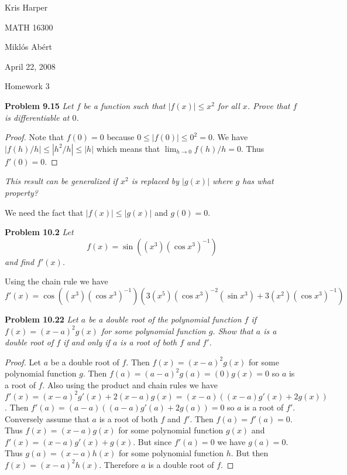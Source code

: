 \documentclass{article}
\begin{document}
\begin{flushright}
Kris Harper

MATH 16300

Mikl\'{o}s Ab\'{e}rt

April 22, 2008
\end{flushright}

\begin{center}
Homework 3
\end{center}

\begin{flushleft}

\textbf{Problem 9.15}
\textsl{Let $f$ be a function such that $|f(x)| \leq x^2$ for all $x$. Prove that $f$ is differentiable at $0$.}
\begin{proof}
Note that $f(0) = 0$ because $0 \leq |f(0)| \leq 0^2 = 0$. We have $|f(h)/h| \leq |h^2/h| \leq |h|$ which means that $\lim_{h \rightarrow 0} f(h)/h = 0$. Thus $f'(0) = 0$.
\end{proof}

\textsl{This result can be generalized if $x^2$ is replaced by $|g(x)|$ where $g$ has what property?}\newline

We need the fact that $|f(x)| \leq |g(x)|$ and $g(0) = 0$.\newline

\textbf{Problem 10.2}
\textsl{Let
\[
f(x) = \sin \left ( (x^3)(\cos x^3)^{-1} \right )
\]
and find $f'(x)$.}\newline

Using the chain rule we have
\[
f'(x) = \cos \left ( (x^3)(\cos x^3)^{-1} \right ) \left ( 3(x^5)(\cos x^3)^{-2}(\sin x^3) + 3(x^2)(\cos x^3)^{-1} \right )
\]\newline

\textbf{Problem 10.22}
\textsl{Let $a$ be a double root of the polynomial function $f$ if $f(x) = (x-a)^2g(x)$ for some polynomial function $g$. Show that $a$ is a double root of $f$ if and only if $a$ is a root of both $f$ and $f'$.}
\begin{proof}
Let $a$ be a double root of $f$. Then $f(x) = (x-a)^2g(x)$ for some polynomial function $g$. Then $f(a) = (a-a)^2g(a) = (0)g(x) = 0$ so $a$ is a root of $f$. Also using the product and chain rules we have $f'(x) = (x-a)^2g'(x) + 2(x-a)g(x) = (x-a)((x-a)g'(x) + 2g(x))$. Then $f'(a) = (a-a)((a-a)g'(a) + 2g(a)) = 0$ so $a$ is a root of $f'$. Conversely assume that $a$ is a root of both $f$ and $f'$. Then $f(a) = f'(a) = 0$. Thus $f(x) = (x-a)g(x)$ for some polynomial function $g(x)$ and $f'(x) = (x-a)g'(x) + g(x)$. But since $f'(a) = 0$ we have $g(a) = 0$. Thus $g(a) = (x-a) h(x)$ for some polynomial function $h$. But then $f(x) = (x-a)^2h(x)$. Therefore $a$ is a double root of $f$.
\end{proof}


\end{flushleft}
\end{document}
